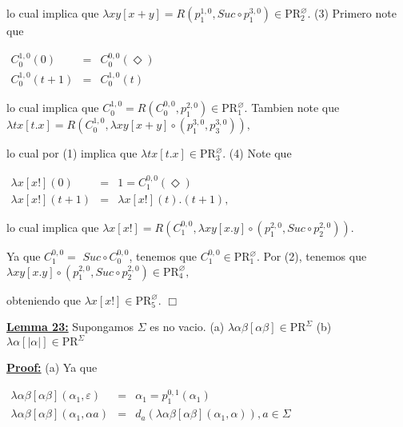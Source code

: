   lo cual implica que \(\lambda xy\left[ x+y\right] =R\left( p_{1}^{1,0},Suc\circ p_{1}^{3,0}\right) \in \mathrm{PR}_{2}^{\varnothing }.\)
  (3) Primero note que

  \(\displaystyle \begin{array}{rcl} C_{0}^{1,0}(0) & =& C_{0}^{0,0}(\Diamond ) \\ C_{0}^{1,0}(t+1) & =& C_{0}^{1,0}(t) \end{array} \)

  lo cual implica que \(C_{0}^{1,0}=R\left( C_{0}^{0,0},p_{1}^{2,0}\right) \in \mathrm{PR}_{1}^{\varnothing }.\) Tambien note que
  \(\displaystyle \lambda tx\left[ t.x\right] =R\left( C_{0}^{1,0},\lambda xy\left[ x+y\right] \circ \left( p_{1}^{3,0},p_{3}^{3,0}\right) \right) , \)

  lo cual por (1) implica que \(\lambda tx\left[ t.x\right] \in \mathrm{PR} _{3}^{\varnothing }\).
  (4) Note que

  \(\displaystyle \begin{array}{rcl} \lambda x\left[ x!\right] (0) & =& 1=C_{1}^{0,0}(\Diamond ) \\ \lambda x\left[ x!\right] (t+1) & =& \lambda x\left[ x!\right] (t).(t+1), \end{array} \)

  lo cual implica que
  \(\displaystyle \lambda x\left[ x!\right] =R\left( C_{1}^{0,0},\lambda xy\left[ x.y\right] \circ \left( p_{1}^{2,0},Suc\circ p_{2}^{2,0}\right) \right) . \)

  Ya que \(C_{1}^{0,0}=\) \(Suc\circ C_{0}^{0,0}\), tenemos que \(C_{1}^{0,0}\in \mathrm{PR}_{1}^{\varnothing }\). Por (2), tenemos que
  \(\displaystyle \lambda xy\left[ x.y\right] \circ \left( p_{1}^{2,0},Suc\circ p_{2}^{2,0}\right) \in \mathrm{PR}_{4}^{\varnothing }, \)

  obteniendo que \(\lambda x\left[ x!\right] \in \mathrm{PR}_{5}^{\varnothing }\). \(\Box\)


  \textbf{\underline{Lemma 23:}} Supongamos \(\Sigma \) es no vacio.
  (a) \(\lambda \alpha \beta \left[ \alpha \beta \right] \in \mathrm{PR} ^{\Sigma }\)
  (b) \(\lambda \alpha \left[ \left\vert \alpha \right\vert \right] \in \mathrm{PR}^{\Sigma }\)

  \textbf{\underline{Proof:}} (a) Ya que

  \(\displaystyle \begin{array}{rcl} \lambda \alpha \beta \left[ \alpha \beta \right] (\alpha _{1},\varepsilon ) & =& \alpha _{1}=p_{1}^{0,1}(\alpha _{1}) \\ \lambda \alpha \beta \left[ \alpha \beta \right] (\alpha _{1},\alpha a) & =& d_{a}(\lambda \alpha \beta \left[ \alpha \beta \right] (\alpha _{1},\alpha )),a\in \Sigma \end{array} \)

